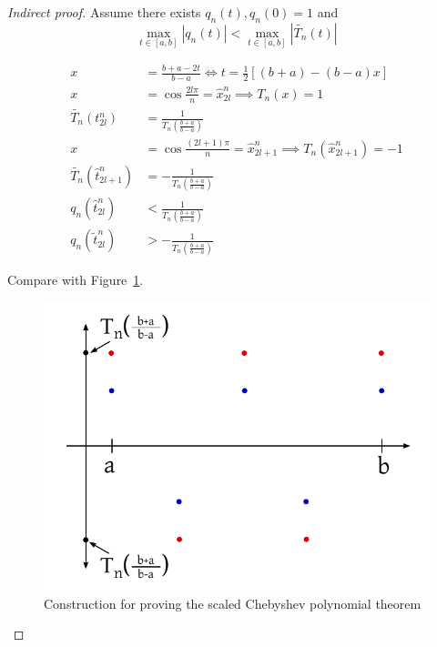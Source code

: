 \documentclass{article}
\newcommand{\card}[1]{\left|#1\right|}
\begin{document}
\begin{proof}[Indirect proof]
  Assume there exists $q_n(t), q_n(0) = 1$ and
  \[ \max_{t \in [a,b]} \card{q_n(t)} < \max_{t \in [a,b]} \card{\tilde{T_n}(t)} \]

  \begin{align*}
    x &= \frac{b + a - 2t}{b - a} \iff t = \frac12 \left[ (b + a) - (b - a) x \right] \\
    x &= \cos{\frac{2l\pi}{n}} = \hat{x}_{2l}^n \implies T_n(x) = 1 \\
    \tilde{T_n}(t_{2l}^n) &= \frac{1}{T_n\left(\frac{b + a}{b - a}\right)} \\
    x &= \cos{\frac{(2l + 1) \pi}{n}} = \hat{x}_{2l+1}^n \implies T_n(\hat{x}_{2l+1}^n) = -1 \\
    \tilde{T_n}(\hat{t}_{2l+1}^n) &= -\frac{1}{T_n\left(\frac{b + a}{b - a}\right)} \\
    q_n\left(\hat{t}_{2l}^n\right) &< \frac{1}{T_n\left(\frac{b + a}{b - a}\right)} \\
    q_n(\tilde{t}_{2l}^n) &> -\frac{1}{T_n\left(\frac{b + a}{b - a}\right)}
  \end{align*}

  Compare with Figure~\ref{img:scpt}.

  \begin{figure}[b]
    \begin{center}
      \includegraphics{img/03b_scaled_chebyshev_polynomials_theorem.pdf}
      \caption{Construction for proving the scaled Chebyshev polynomial theorem}
      \label{img:scpt}
    \end{center}
  \end{figure}


\end{proof}
\end{document}

